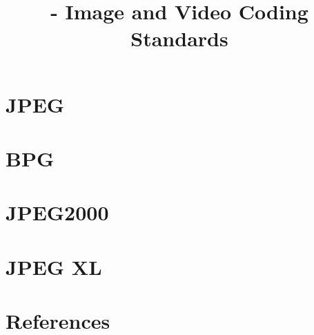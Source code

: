 
\title{\SM{} - Image and Video Coding Standards}

\maketitle

\tableofcontents

\section{JPEG}

\section{BPG}

\section{JPEG2000}

\section{JPEG XL}

\section{References}

\renewcommand{\addcontentsline}[3]{}%

